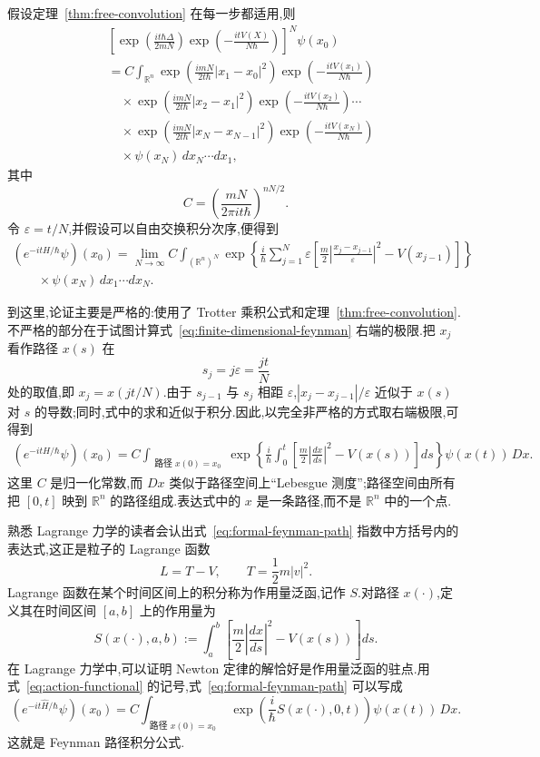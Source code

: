 假设定理~\ref{thm:free-convolution} 在每一步都适用,则
\[
\begin{aligned}
 &\left[
 \exp\left(\frac{it\hbar\Delta}{2mN}\right)
 \exp\left(-\frac{itV(X)}{N\hbar}\right)
 \right]^N\psi(x_0)\\
 &=C\int_{\mathbb R^n}\exp\left(\frac{imN}{2t\hbar}|x_1-x_0|^2\right)
 \exp\left(-\frac{itV(x_1)}{N\hbar}\right)\\
 &\quad\times
 \exp\left(\frac{imN}{2t\hbar}|x_2-x_1|^2\right)
 \exp\left(-\frac{itV(x_2)}{N\hbar}\right)\cdots\\
 &\quad\times
 \exp\left(\frac{imN}{2t\hbar}|x_N-x_{N-1}|^2\right)
 \exp\left(-\frac{itV(x_N)}{N\hbar}\right)\\
 &\quad\times\psi(x_N)\,dx_N\cdots dx_1,
\end{aligned}
\]
其中
\[
 C=\left(\frac{mN}{2\pi i t\hbar}\right)^{nN/2}.
\]
令 $\varepsilon=t/N$,并假设可以自由交换积分次序,便得到
\[
\begin{aligned}
 (e^{-it\widehat H/\hbar}\psi)(x_0)
 =\lim_{N\to\infty}C\int_{(\mathbb R^n)^N}
 \exp\left\{\frac{i}{\hbar}\sum_{j=1}^N\varepsilon
 \left[\frac m2\left|\frac{x_j-x_{j-1}}{\varepsilon}\right|^2
 -V(x_{j-1})\right]\right\}\\
 \qquad\times\psi(x_N)\,dx_1\cdots dx_N.\label{eq:finite-dimensional-feynman}
\end{aligned}
\]

到这里,论证主要是严格的:使用了 Trotter 乘积公式和定理~\ref{thm:free-convolution}.不严格的部分在于试图计算式~\eqref{eq:finite-dimensional-feynman} 右端的极限.把 $x_j$ 看作路径 $x(s)$ 在
\[
 s_j=j\varepsilon=\frac{jt}{N}
\]
处的取值,即 $x_j=x(jt/N)$.由于 $s_{j-1}$ 与 $s_j$ 相距 $\varepsilon$,$|x_j-x_{j-1}|/\varepsilon$ 近似于 $x(s)$ 对 $s$ 的导数;同时,式中的求和近似于积分.因此,以完全非严格的方式取右端极限,可得到
\[
\begin{aligned}
 (e^{-it\widehat H/\hbar}\psi)(x_0)
 =C\int_{\substack{\text{路径 }x(0)=x_0}}
 \exp\left\{\frac{i}{\hbar}\int_0^t
 \left[\frac m2\left|\frac{dx}{ds}\right|^2-V(x(s))\right]ds\right\}
 \psi(x(t))\,Dx.\label{eq:formal-feynman-path}
\end{aligned}
\]
这里 $C$ 是归一化常数,而 $Dx$ 类似于路径空间上“Lebesgue 测度”;路径空间由所有把 $[0,t]$ 映到 $\mathbb R^n$ 的路径组成.表达式中的 $x$ 是一条路径,而不是 $\mathbb R^n$ 中的一个点.

熟悉 Lagrange 力学的读者会认出式~\eqref{eq:formal-feynman-path} 指数中方括号内的表达式,这正是粒子的 Lagrange 函数
\[
 L=T-V,\qquad T=\frac12m|v|^2.
\]
Lagrange 函数在某个时间区间上的积分称为作用量泛函,记作 $S$.对路径 $x(\cdot)$,定义其在时间区间 $[a,b]$ 上的作用量为
\[
 S(x(\cdot),a,b)
 :=\int_a^b\left[\frac m2\left|\frac{dx}{ds}\right|^2
 -V(x(s))\right]ds.\label{eq:action-functional}
\]
在 Lagrange 力学中,可以证明 Newton 定律的解恰好是作用量泛函的驻点.用式~\eqref{eq:action-functional} 的记号,式~\eqref{eq:formal-feynman-path} 可以写成
\[
 (e^{-it\widehat H/\hbar}\psi)(x_0)
 =C\int_{\substack{\text{路径 }x(0)=x_0}}
 \exp\left(\frac{i}{\hbar}S(x(\cdot),0,t)\right)
 \psi(x(t))\,Dx.\label{eq:feynman-path-integral}
\]
这就是 Feynman 路径积分公式.


